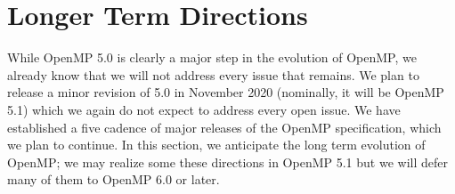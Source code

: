 \section{Longer Term Directions}
\label{sec:future_directions}

While OpenMP 5.0 is clearly a major step in the evolution of OpenMP,
we already know that we will not address every issue that remains.
We plan to release a minor revision of 5.0 in November 2020 (nominally,
it will be OpenMP 5.1) which we again do not expect to address every
open issue. We have established a five cadence of major releases of the
OpenMP specification, which we plan to continue. In this section, we 
anticipate the long term evolution of OpenMP; we may realize some these 
directions in OpenMP 5.1 but we will defer many of them to OpenMP 6.0 
or later. 









